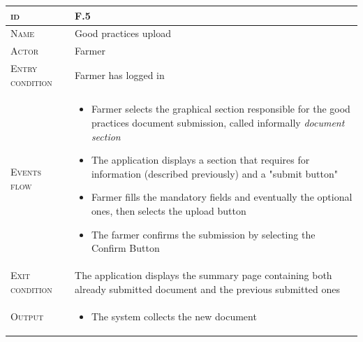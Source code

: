 
\begin{table}[H]
    \centering
    \begin{tabular}{|l|p{}|}
        \hline %
    	\textsc{id}                 &   F.5\\
    	\hline %
    	\textsc{Name}               &   Good practices upload\\
    	\hline %
    	\textsc{Actor}             &   Farmer\\
    	\hline %
    	\textsc{Entry condition}   &   Farmer has logged in\\
    	\hline %
    	\textsc{Events flow}         &   %
            	                        \begin{itemize}
                                    	    \item Farmer selects the graphical section responsible for the good practices document submission, called informally \textit{document section}
                                    		\item The application displays a section that requires for information (described previously) and a "submit button"
                                    		\item Farmer fills the mandatory fields and eventually the optional ones, then selects the upload button
                                    		\item The farmer confirms the submission by selecting the Confirm Button
                                        \end{itemize}\\
        \hline %
        \textsc{Exit condition}    &  The application displays the summary page containing both already submitted document and the previous submitted ones\\
    	\hline %
    	\textsc{Output}             &  \begin{itemize}
    	    \item The system collects the new document

\end{itemize}
\end{tabular}
\end{table}
